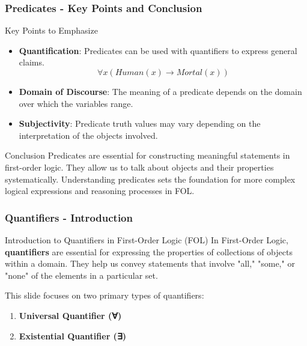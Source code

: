 \documentclass[aspectratio=169]{beamer}
\begin{document}
\begin{frame}[fragile]
    \frametitle{Predicates - Key Points and Conclusion}
    \begin{block}{Key Points to Emphasize}
        \begin{itemize}
            \item \textbf{Quantification}: Predicates can be used with quantifiers to express general claims.
            \begin{equation}
                \forall x (Human(x) \rightarrow Mortal(x))
            \end{equation}
            \item \textbf{Domain of Discourse}: The meaning of a predicate depends on the domain over which the variables range.
            \item \textbf{Subjectivity}: Predicate truth values may vary depending on the interpretation of the objects involved.
        \end{itemize}
    \end{block}

    \begin{block}{Conclusion}
        Predicates are essential for constructing meaningful statements in first-order logic. 
        They allow us to talk about objects and their properties systematically. 
        Understanding predicates sets the foundation for more complex logical expressions and reasoning processes in FOL.
    \end{block}
\end{frame}

\begin{frame}[fragile]
    \frametitle{Quantifiers - Introduction}
    \begin{block}{Introduction to Quantifiers in First-Order Logic (FOL)}
        In First-Order Logic, \textbf{quantifiers} are essential for expressing the properties of collections of objects within a domain. 
        They help us convey statements that involve "all," "some," or "none" of the elements in a particular set.
    \end{block}
    
    This slide focuses on two primary types of quantifiers:
    \begin{enumerate}
        \item \textbf{Universal Quantifier (∀)}
        \item \textbf{Existential Quantifier (∃)}
    \end{enumerate}
\end{frame}
\end{document}
